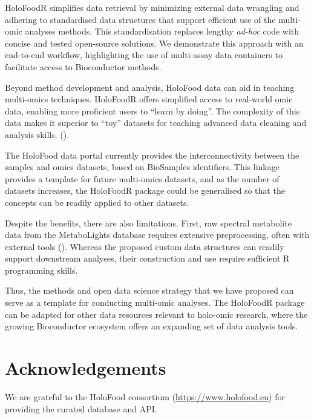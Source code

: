 \documentclass[unnumsec,webpdf,namedate,modern,large]{oup-authoring-template}%
\begin{document}
HoloFoodR simplifies data retrieval by minimizing external data wrangling and adhering to standardised data structures that support efficient use of the multi-omic analyses methods. This standardisation replaces lengthy \textit{ad-hoc} code with concise and tested open-source solutions. We demonstrate this approach with an end-to-end workflow, highlighting the use of multi-assay data containers to facilitate access to Bioconductor methods.

Beyond method development and analysis, HoloFood data can aid in teaching multi-omics techniques. HoloFoodR offers simplified access to real-world omic data, enabling more proficient users to “learn by doing”. The complexity of this data makes it superior to “toy” datasets for teaching advanced data cleaning and analysis skills. (\cite{drnevich_2025}).

The HoloFood data portal currently provides the interconnectivity between the samples and omics datasets, based on BioSamples identifiers. This linkage provides a template for future multi-omics datasets, and as the number of datasets increases, the HoloFoodR package could be generalised so that the concepts can be readily applied to other datasets.

Despite the benefits, there are also limitations. First, raw spectral metabolite data from the MetaboLights database requires extensive preprocessing, often with external tools (\cite{klavus_2020}). Whereas the proposed custom data structures can readily support downstream analyses, their construction and use require sufficient R programming skills.

Thus, the methods and open data science strategy that we have proposed can serve as a template for conducting multi-omic analyses. The HoloFoodR package can be adapted for other data resources relevant to holo-omic research, where the growing Bioconductor ecosystem offers an expanding set of data analysis tools.

\section{Acknowledgements}

We are grateful to the HoloFood consortium (\url{https://www.holofood.eu}) for providing the curated database and API.

\end{document}
